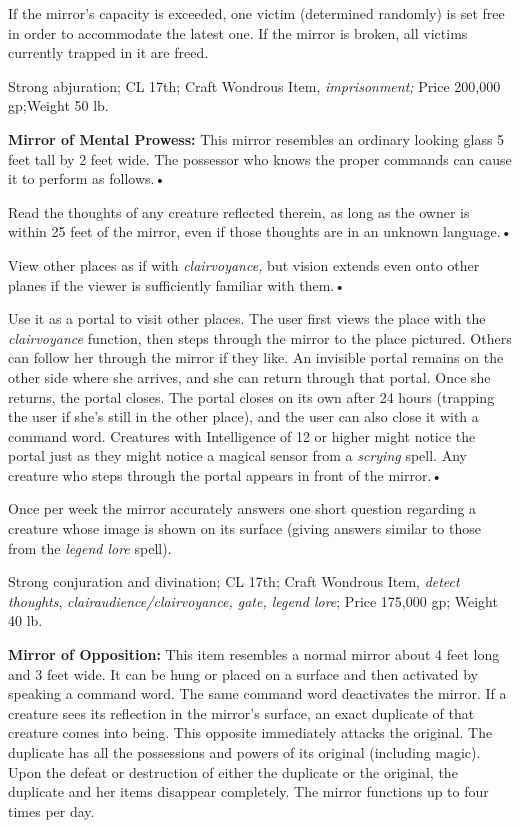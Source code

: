 If the mirror's capacity is exceeded, one victim (determined randomly) is set free 
in order to accommodate the latest one. If the mirror is broken, all victims currently 
trapped in it are freed.

Strong abjuration; CL 17th; Craft Wondrous Item, \textit{imprisonment; }Price 200,000 
gp;Weight 50 lb.

\textbf{Mirror of Mental Prowess:} This mirror resembles an ordinary looking glass 
5 feet tall by 2 feet wide. The possessor who knows the proper commands can cause 
it to perform as follows.•

Read the thoughts of any creature reflected therein, as long as the owner is within 
25 feet of the mirror, even if those thoughts are in an unknown language.•

View other places as if with \textit{clairvoyance, }but vision extends even onto 
other planes if the viewer is sufficiently familiar with them.•

Use it as a portal to visit other places. The user first views the place with the 
\textit{clairvoyance }function, then steps through the mirror to the place pictured. 
Others can follow her through the mirror if they like. An invisible portal remains 
on the other side where she arrives, and she can return through that portal. Once 
she returns, the portal closes. The portal closes on its own after 24 hours (trapping 
the user if she's still in the other place), and the user can also close it with 
a command word. Creatures with Intelligence of 12 or higher might notice the portal 
just as they might notice a magical sensor from a \textit{scrying }spell. Any creature 
who steps through the portal appears in front of the mirror.•

Once per week the mirror accurately answers one short question regarding a creature 
whose image is shown on its surface (giving answers similar to those from the \textit{legend 
lore }spell).

Strong conjuration and divination; CL 17th; Craft Wondrous Item, \textit{detect 
thoughts}, \textit{clairaudience/clairvoyance, gate, legend lore}; Price 175,000 
gp; Weight 40 lb.

\textbf{Mirror of Opposition:} This item resembles a normal mirror about 4 feet 
long and 3 feet wide. It can be hung or placed on a surface and then activated 
by speaking a command word. The same command word deactivates the mirror. If a 
creature sees its reflection in the mirror's surface, an exact duplicate of that 
creature comes into being. This opposite immediately attacks the original. The 
duplicate has all the possessions and powers of its original (including magic). 
Upon the defeat or destruction of either the duplicate or the original, the duplicate 
and her items disappear completely. The mirror functions up to four times per day.

